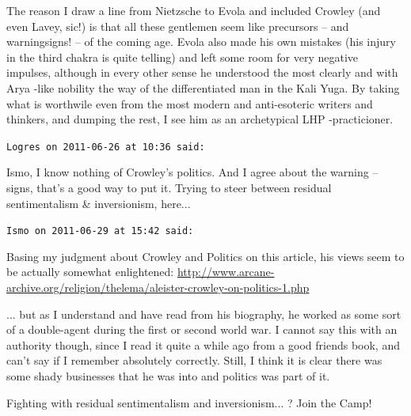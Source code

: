 \begin{footnotesize}
\begin{sffamily}
The reason I draw a line from Nietzsche to Evola and included Crowley (and even Lavey, sic!) is that all these gentlemen seem like precursors -- and warningsigns! -- of the coming age. Evola also made his own mistakes (his injury in the third chakra is quite telling) and left some room for very negative impulses, although in every other sense he understood the most clearly and with Arya -like nobility the way of the differentiated man in the Kali Yuga. By taking what is worthwile even from the most modern and anti-esoteric writers and thinkers, and dumping the rest, I see him as an archetypical LHP -practicioner.

\hfill

\texttt{Logres on 2011-06-26 at 10:36 said:}

Ismo, I know nothing of Crowley's politics. And I agree about the warning -- signs, that's a good way to put it. Trying to steer between residual sentimentalism \& inversionism, here... 

\hfill

\texttt{Ismo on 2011-06-29 at 15:42 said:}

Basing my judgment about Crowley and Politics on this article, his views seem to be actually somewhat enlightened:
\url{http://www.arcane-archive.org/religion/thelema/aleister-crowley-on-politics-1.php}


... but as I understand and have read from his biography, he worked as some sort of a double-agent during the first or second world war. I cannot say this with an authority though, since I read it quite a while ago from a good friends book, and can't say if I remember absolutely correctly. Still, I think it is clear there was some shady businesses that he was into and politics was part of it.

Fighting with residual sentimentalism and inversionism... ? Join the Camp!

\hfill

\end{sffamily}
\end{footnotesize}

